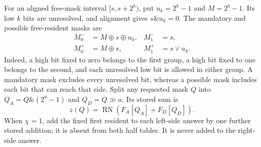 \documentclass[11pt]{article}
\begin{document}
For an aligned free-mask interval $[s,s+2^k)$, put $u_k=2^k-1$ and $M=2^b-1$. Its low $k$ bits are unresolved, and alignment gives $s\mathbin{\&}u_k=0$. The mandatory and possible free-resident masks are
\begin{align}
M_0^-&=M\mathbin{\oplus}s\mathbin{\oplus}u_k,&M_1^-&=s,\nonumber\\
M_0^+&=M\mathbin{\oplus}s,&M_1^+&=s\mathbin{\lor}u_k.
\label{eq:half-subset-range-masks}
\end{align}
Indeed, a high bit fixed to zero belongs to the first group, a high bit fixed to one belongs to the second, and each unresolved low bit is allowed in either group. A mandatory mask excludes every unresolved bit, whereas a possible mask includes each bit that can reach that side. Split any requested mask $Q$ into $Q_A=Q\mathbin{\&}(2^a-1)$ and $Q_D=Q\mathbin{\gg}a$. Its stored sum is
\begin{equation}
z(Q)=\operatorname{RN}\!\left(F_A[Q_A]+F_D[Q_D]\right).
\label{eq:half-subset-lookup}
\end{equation}
When $\chi=1$, add the fixed first resident to each left-side answer by one further stored addition; it is absent from both half tables. It is never added to the right-side answer.
\end{document}
